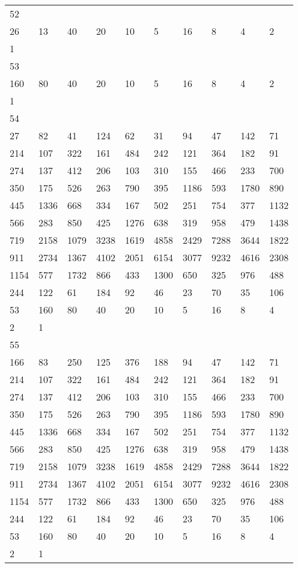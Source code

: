 \begin{longtable}{*{10}{l}}
52&&&&&&&&&\\
26& 13& 40& 20& 10& 5& 16& 8& 4& 2\\
1& \\

53&&&&&&&&&\\
160& 80& 40& 20& 10& 5& 16& 8& 4& 2\\
1& \\

54&&&&&&&&&\\
27& 82& 41& 124& 62& 31& 94& 47& 142& 71\\
214& 107& 322& 161& 484& 242& 121& 364& 182& 91\\
274& 137& 412& 206& 103& 310& 155& 466& 233& 700\\
350& 175& 526& 263& 790& 395& 1186& 593& 1780& 890\\
445& 1336& 668& 334& 167& 502& 251& 754& 377& 1132\\
566& 283& 850& 425& 1276& 638& 319& 958& 479& 1438\\
719& 2158& 1079& 3238& 1619& 4858& 2429& 7288& 3644& 1822\\
911& 2734& 1367& 4102& 2051& 6154& 3077& 9232& 4616& 2308\\
1154& 577& 1732& 866& 433& 1300& 650& 325& 976& 488\\
244& 122& 61& 184& 92& 46& 23& 70& 35& 106\\
53& 160& 80& 40& 20& 10& 5& 16& 8& 4\\
2& 1& \\

55&&&&&&&&&\\
166& 83& 250& 125& 376& 188& 94& 47& 142& 71\\
214& 107& 322& 161& 484& 242& 121& 364& 182& 91\\
274& 137& 412& 206& 103& 310& 155& 466& 233& 700\\
350& 175& 526& 263& 790& 395& 1186& 593& 1780& 890\\
445& 1336& 668& 334& 167& 502& 251& 754& 377& 1132\\
566& 283& 850& 425& 1276& 638& 319& 958& 479& 1438\\
719& 2158& 1079& 3238& 1619& 4858& 2429& 7288& 3644& 1822\\
911& 2734& 1367& 4102& 2051& 6154& 3077& 9232& 4616& 2308\\
1154& 577& 1732& 866& 433& 1300& 650& 325& 976& 488\\
244& 122& 61& 184& 92& 46& 23& 70& 35& 106\\
53& 160& 80& 40& 20& 10& 5& 16& 8& 4\\
2& 1& \\


\end{longtable}
